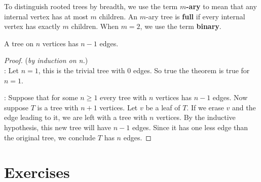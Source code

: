 To distinguish rooted trees by breadth, we use the term {\bfseries {$m$-ary}} to mean that any internal
vertex has at most $m$ children. An $m$-ary tree is {\bfseries {full}} if every internal vertex has
exactly $m$ children. When $m=2$, we use the term {\bfseries {binary}}.


\begin{thm}
 A tree on $n$ vertices has $n-1$ edges.
\end{thm}
\begin{proof}
 ({\it by induction on n.})\\
: Let $n = 1$, this is the trivial tree with $0$ edges.  So true the theorem is true for $n = 1$.

:
Suppose that for some $n\geq 1$ every tree with $n$ vertices has $n-1$ edges.
Now suppose $T$ is a tree with $n+1$ vertices. Let $v$ be a leaf of $T$.
If we erase $v$ and the edge leading to it, we are left with a tree with $n$ vertices.
By the inductive hypothesis, this new tree will have $n-1$ edges. Since it has one less edge than the original tree, we conclude $T$ has $n$ edges.
\end{proof}

\clearpage
\section{Exercises}

